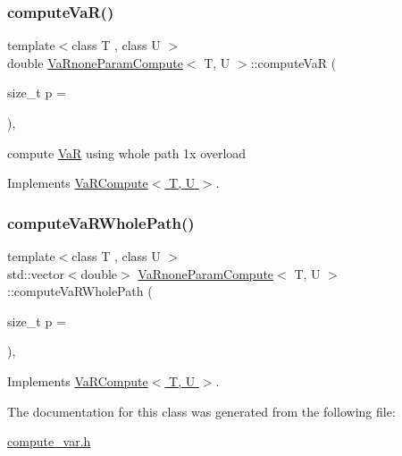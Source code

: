 \subsubsection{\texorpdfstring{compute\+Va\+R()}{computeVaR()}}
{\footnotesize\ttfamily template$<$class T , class U $>$ \\
double \hyperlink{classVaRnoneParamCompute}{Va\+Rnone\+Param\+Compute}$<$ T, U $>$\+::compute\+VaR (\begin{DoxyParamCaption}\item[{size\+\_\+t}]{p = {} }\end{DoxyParamCaption})\hspace{0.3cm}{\ttfamily [inline]}, {\ttfamily [virtual]}}



compute \hyperlink{classVaR}{VaR} using whole path 1x overload 



Implements \hyperlink{classVaRCompute_a0465221010d248238fe1052958776984}{Va\+R\+Compute$<$ T, U $>$}.

\hypertarget{classVaRnoneParamCompute_a7ddfb62c4e1e9890542818c75c51798e}{}\label{classVaRnoneParamCompute_a7ddfb62c4e1e9890542818c75c51798e} 
\subsubsection{\texorpdfstring{compute\+Va\+R\+Whole\+Path()}{computeVaRWholePath()}}
{\footnotesize\ttfamily template$<$class T , class U $>$ \\
std\+::vector$<$double$>$ \hyperlink{classVaRnoneParamCompute}{Va\+Rnone\+Param\+Compute}$<$ T, U $>$\+::compute\+Va\+R\+Whole\+Path (\begin{DoxyParamCaption}\item[{size\+\_\+t}]{p = {} }\end{DoxyParamCaption})\hspace{0.3cm}{\ttfamily [inline]}, {\ttfamily [virtual]}}



Implements \hyperlink{classVaRCompute_ad5ec9feb42ea2f99f2c91e793d18fe1b}{Va\+R\+Compute$<$ T, U $>$}.



The documentation for this class was generated from the following file\+:\begin{DoxyCompactItemize}
\item 
\hyperlink{compute__var_8h}{compute\+\_\+var.\+h}\end{DoxyCompactItemize}

